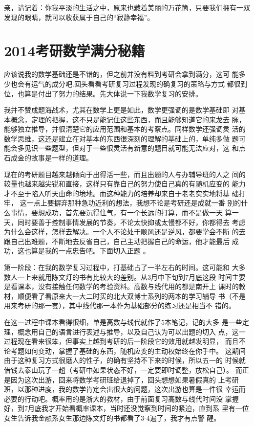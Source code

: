 \documentclass[11pt,twoside,openany,x11names,svgnames]{memoir}
\begin{document}
亲，请记着：你我平淡的生活之中，原来也藏着美丽的万花筒，只要我们拥有一双发现的眼睛，就可以收获属于自己的“寂静幸福”。
\section{2014考研数学满分秘籍}
应该说我的数学基础还是不错的，但之前并没有料到考研会拿到满分，这可
能多少也会有运气的成分吧.回头看看考研复习过程发现的确复习的策略与方式
都很到位，也算是付出了努力的结果。先大体说一下我数学复习的安排。

我并不赞成题海战术，尤其在数学上更是如此，数学更强调的是数学基础即
对基本概念，定理的把握，这不只是能记住这些东西，而且能够知道它的来龙去
脉，能够独立推导，并很清楚它的应用范围和基本的考察点。同样数学还强调灵
活的数学思维，这还是建立在对基本的东西很深刻的理解的基础上的，单纯多做
题可能会多见识一些题型，但对于一些很灵活有新意的题目就可能无法应对，这
和点石成金的故事是一样的道理。

现在的考研题目越来越倾向于出得活一些，而且出题的人与办辅导班的人之
间的较量也越来越尖锐和直接，这样只有靠自己的努力使自己真的有随机应变的
能力才不至于陷入听天由命的境地。而这种能力的培养却来自于老老实实地将基
础打牢， 这一点上要摒弃那种急功近利的想法，我想不论是考研还是成就一番
别的什么事情，要想成功，首先要沉得住气，有一个长远的打算，而不是做一天
算一天，同时要善于控制事情发展的节奏，不论太快抑或太慢都不好，你都得去
考虑为什么会这样，怎样去解决。一个人不论处于顺风还是逆风，都要学会不断
的去跟自己出难题，不断地去反省自己，自己主动把握自己的命运，他才能最后
成功，这也算是我的一点忠告吧。下面切入正题 。

第一阶段：在我的数学复习过程中，打基础占了一半左右的时间。这可能和
大多数人一上来就用陈文灯的书有比较大的差别。从3月中下旬到7月底这段
时间主要是看课本，没有接触任何数学的考验资料。高数与线代用的都是南开上
课时的教材，顺便看了看原来大一大二时买的北大双博士系列的两本的学习辅导
书（不是用来考研的那一套），其中线代那一本作为基础部分的练习还是相当不
错的。

在这一过程中课本看得很细，单是高数与线代就作了5本笔记，记的大多
是一些定理，概念用自己的语言进行表述与推导，以及自己认为可以出题的切入
点，这一过程现在看来很笨，但事实上越到考研的后一阶段它的效用就越发明显，
而且不论考题如何变动，掌握了基础的东西，随机应变的主动权始终在你手中。
这期间由于这种复习方式很磨人的性子，的确有坚持不下来的时候，所以五一的
时候就借钱去泰山玩了一趟（考研中如果状态不好，一定要即时调整，放松自己）。
而正是因为这次出游，回来将数学考研班给退掉了，回头想想如果暑假真的
上考研班，以那种进度，我的数学肯定会出很大的问题，这次出游也算是一件很
幸运而必要的行动吧。概率用的是浙大的教材，由于前面复习高数与线代时间没
掌握好，到7月底我才开始看概率课本，当时还没觉察到时间的紧迫，直到系
里有一位女生告诉我金融系女生那边陈文灯的书都看了3-4遍了，我才有点警
醒。
\end{document}
